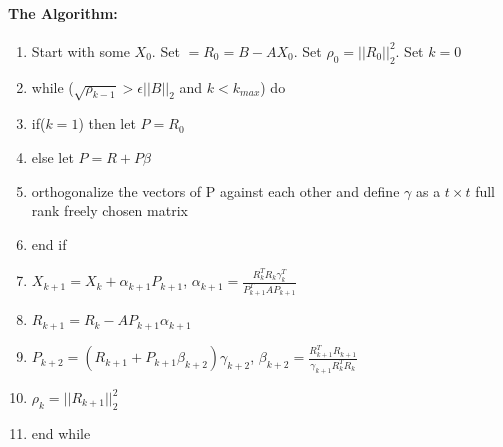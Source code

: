 \documentclass[]{scrartcl}
\begin{document}
\paragraph{The Algorithm:}
\begin{enumerate}
		\item Start with some $X_{0}$. Set $=R_{0}=B-AX_{0}$. Set $\rho_{0}=||R_{0}||_{2}^{2}$. Set $k=0$
		\item while ($\sqrt{\rho_{k-1}} > \epsilon ||B||_{2}$ and $k<k_{max}$) do
		\item \qquad if($k=1$) then let $P=R_{0}$ 
		\item \qquad else let $P=R+P\beta$
		\item \qquad \qquad orthogonalize the vectors of P against each other and define $\gamma$ as a $t\times t$ full rank freely chosen matrix  
		\item \qquad end if
		\item \qquad $X_{k+1}=X_{k}+\alpha_{k+1}P_{k+1}$, $\alpha_{k+1}=\frac{R_{k}^{T}R_{k}\gamma_{k}^{T}}{P^{T}_{k+1}AP_{k+1}}$
		\item \qquad $R_{k+1}=R_{k}-AP_{k+1}\alpha_{k+1}$
		\item \qquad $P_{k+2}=(R_{k+1}+P_{k+1}\beta_{k+2})\gamma_{k+2}$, $\beta_{k+2}=\frac{R^{T}_{k+1}R_{k+1}}{\gamma_{k+1}R^{T}_{k}R_{k}}$
		\item \qquad $\rho_{k}=||R_{k+1}||_{2}^{2}$
		\item end while
\end{enumerate}
\end{document}
